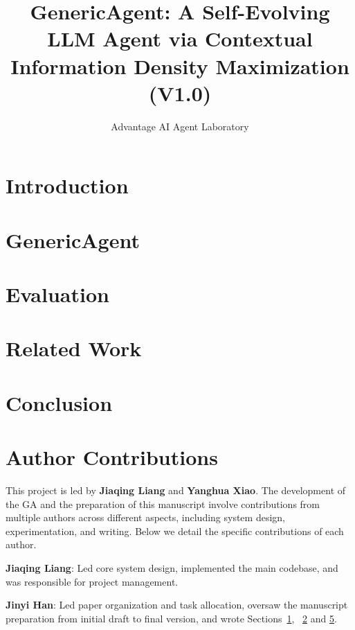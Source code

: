 \documentclass[]{kw_latex_template}
\title{GenericAgent: A Self-Evolving LLM Agent via Contextual Information Density Maximization (V1.0)
}
\author{
Advantage AI Agent Laboratory \\
}
\begin{document}
\maketitle

\section{Introduction}
\label{sec:intro}


\section{GenericAgent}
\label{sec:method}


\section{Evaluation}
\label{sec:eval}


\section{Related Work}
\label{sec:related}


\section{Conclusion}
\label{sec:conclusion}


\clearpage



\clearpage
\section{Author Contributions}
\label{sec:contributions}
This project is led by \textbf{Jiaqing Liang} and \textbf{Yanghua Xiao}. The development of the GA and the preparation of this manuscript involve contributions from multiple authors across different aspects, including system design, experimentation, and writing. 
Below we detail the specific contributions of each author.

\noindent\textbf{Jiaqing Liang}: Led core system design, implemented the main codebase, and was responsible for project management.

\noindent\textbf{Jinyi Han}: Led paper organization and task allocation, oversaw the manuscript preparation from initial draft to final version, and wrote Sections~\ref{sec:intro}, ~\ref{sec:method} and \ref{sec:conclusion}.
\end{document}
